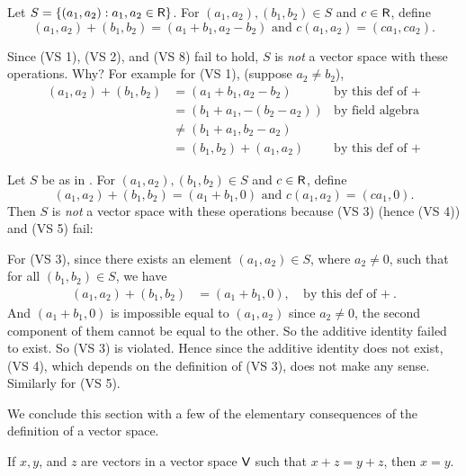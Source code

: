 \begin{example} \label{example 1.2.6}
Let \(S = \{ (a_1, a_2) : a_1, a_2 \in \textsf{R} \}\).
For \((a_1, a_2), (b_1, b_2) \in S\) and \(c \in \textsf{R}\), define
\[
    (a_1, a_2) + (b_1, b_2) = (a_1 + b_1, a_2 - b_2) \text{ and } c(a_1, a_2) = (c a_1, c a_2).
\]

Since  (VS 1), (VS 2), and (VS 8) fail to hold, \(S\) is \emph{not} a vector space with these operations.
Why?
For example for (VS 1), (suppose \(a_2 \ne b_2\)),
\begin{align*}
    (a_1, a_2) + (b_1, b_2) & = (a_1 + b_1, a_2 - b_2) & \text{by this def of \(+\)} \\
                             & = (b_1 + a_1, -(b_2 - a_2)) & \text{by field algebra} \\
                             & \ne (b_1 + a_1, b_2 - a_2) & \\
                             & = (b_1, b_2) + (a_1, a_2) & \text{by this def of \(+\)}
\end{align*}
\end{example}

\begin{example} \label{example 1.2.7}
Let \(S\) be as in .
For \((a_1, a_2), (b_1, b_2) \in S\) and \(c \in \textsf{R}\), define
\[
    (a_1, a_2) + (b_1, b_2) = (a_1 + b_1, 0) \text{ and } c(a_1, a_2) = (c a_1, 0).
\]
Then \(S\) is \emph{not} a vector space with these operations because  (VS 3) (hence (VS 4)) and (VS 5) fail:

For (VS 3), since there exists an element \((a_1, a_2) \in S\), where \(a_2 \ne 0\), such that for all \((b_1, b_2) \in S\), we have
\begin{align*}
    (a_1, a_2) + (b_1, b_2) & = (a_1 + b_1, 0), & \text{by this def of \(+\)}.
\end{align*}
And \((a_1 + b_1, 0)\) is impossible equal to \((a_1, a_2)\) since \(a_2 \ne 0\), the second component of them cannot be equal to the other.
So the additive identity failed to exist.
So (VS 3) is violated.
Hence since the additive identity does not exist, (VS 4), which depends on the definition of (VS 3), does not make any sense.
Similarly for (VS 5).
\end{example}

We conclude this section with a few of the elementary consequences of the definition of a vector space.
\begin{theorem}  \label{thm 1.1}
If \(x, y\), and \(z\) are vectors in a vector space \(\textsf{V}\) such that \(x + z = y + z\), then \(x = y\).
\end{theorem}

